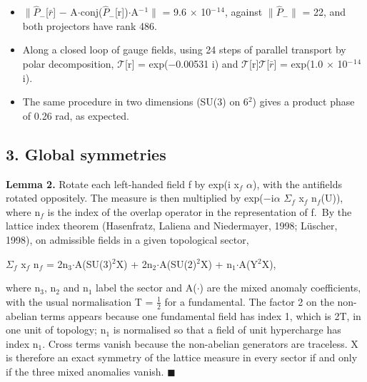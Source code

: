 \documentclass[
]{article}
\providecommand{\tightlist}{%
  \setlength{\itemsep}{0pt}\setlength{\parskip}{0pt}}
\begin{document}
\begin{itemize}
\tightlist
\item
  \ensuremath{\|}\ensuremath{\hat{P}}\ensuremath{_{-}}{[}\ensuremath{\bar{r}}{]} \ensuremath{-} A\ensuremath{\cdot}conj(\ensuremath{\hat{P}}\ensuremath{_{-}}{[}r{]})\ensuremath{\cdot}A\ensuremath{^{-}}\ensuremath{^{1}}\ensuremath{\|} = 9.6 \ensuremath{\times} 10\ensuremath{^{-}}\ensuremath{^{1}}\ensuremath{^{4}}, against \ensuremath{\|}\ensuremath{\hat{P}}\ensuremath{_{-}}\ensuremath{\|} = 22,
  and both projectors have rank 486.
\item
  Along a closed loop of gauge fields, using 24 steps of parallel
  transport by polar decomposition, \ensuremath{\mathcal{T}}{[}r{]} = exp(\ensuremath{-}0.00531 i) and
  \ensuremath{\mathcal{T}}{[}r{]}\ensuremath{\mathcal{T}}{[}\ensuremath{\bar{r}}{]} = exp(1.0 \ensuremath{\times} 10\ensuremath{^{-}}\ensuremath{^{1}}\ensuremath{^{4}} i).
\item
  The same procedure in two dimensions (SU(3) on 6\ensuremath{^{2}}) gives a product
  phase of 0.26 rad, as expected.
\end{itemize}

\hypertarget{global-symmetries}{%
\subsection{3. Global symmetries}\label{global-symmetries}}

\textbf{Lemma 2.} Rotate each left-handed field f by exp(i x\ensuremath{_{f}} \ensuremath{\alpha}), with
the antifields rotated oppositely. The measure is then multiplied by
exp(\ensuremath{-}i\ensuremath{\alpha} \ensuremath{\Sigma}\ensuremath{_{f}} x\ensuremath{_{f}} n\ensuremath{_{f}}(U)), where n\ensuremath{_{f}} is the index of the overlap
operator in the representation of f.~By the lattice index theorem
(Hasenfratz, Laliena and Niedermayer, 1998; Lüscher, 1998), on
admissible fields in a given topological sector,

\ensuremath{\Sigma}\ensuremath{_{f}} x\ensuremath{_{f}} n\ensuremath{_{f}} = 2n\ensuremath{_{3}}\ensuremath{\cdot}A(SU(3)\ensuremath{^{2}}X) + 2n\ensuremath{_{2}}\ensuremath{\cdot}A(SU(2)\ensuremath{^{2}}X) + n\ensuremath{_{1}}\ensuremath{\cdot}A(Y\ensuremath{^{2}}X),

where n\ensuremath{_{3}}, n\ensuremath{_{2}} and n\ensuremath{_{1}} label the sector and A(\ensuremath{\cdot}) are the mixed anomaly
coefficients, with the usual normalisation T = \ensuremath{\tfrac12} for a fundamental. The
factor 2 on the non-abelian terms appears because one fundamental field
has index 1, which is 2T, in one unit of topology; n\ensuremath{_{1}} is normalised so
that a field of unit hypercharge has index n\ensuremath{_{1}}. Cross terms vanish
because the non-abelian generators are traceless. X is therefore an
exact symmetry of the lattice measure in every sector if and only if the
three mixed anomalies vanish. \ensuremath{\blacksquare}
\end{document}

